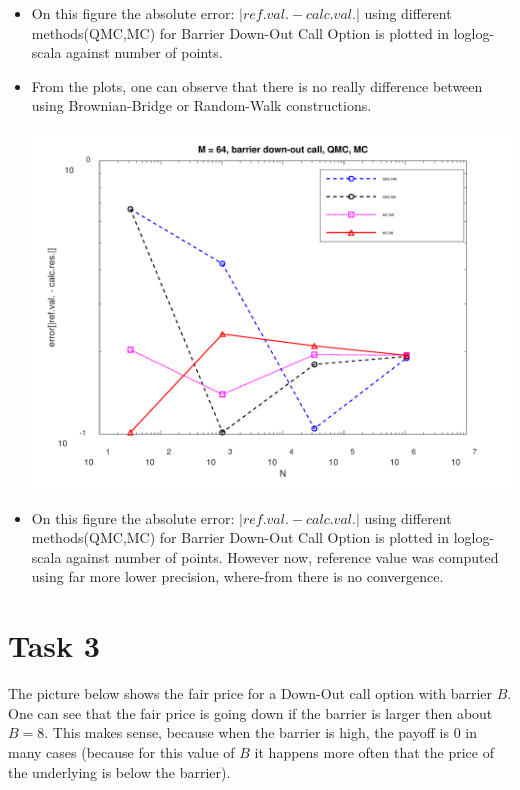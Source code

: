 \documentclass[10pt,a4paper]{article}
\begin{document}
\begin{itemize}
    \item{On this figure the absolute error: $|ref.val.-calc.val.|$ using different methods(QMC,MC) for Barrier Down-Out Call Option is plotted in loglog-scala against number of points.
    }
\item{
From the plots, one can observe that there is no really difference between using Brownian-Bridge or Random-Walk constructions.
}

\begin{center}
	\includegraphics[scale=0.25]{images/task2_error_coarse_discretisation.png}
\end{center}
\item{
On this figure the absolute error: $|ref.val.-calc.val.|$ using different methods(QMC,MC) for Barrier Down-Out Call Option is plotted in loglog-scala against number of points. However now, reference value was computed using far more lower precision, where-from there is no convergence. 
}

\end{itemize}


\section*{Task 3}

The picture below shows the fair price for a Down-Out call option with barrier $B$. One can see that the fair price is going down if the barrier is larger then about $B=8$. This makes sense, because when the barrier is high, the payoff is $0$ in many cases (because for this value of $B$ it happens more often that the price of the underlying is below the barrier).
\end{document}
